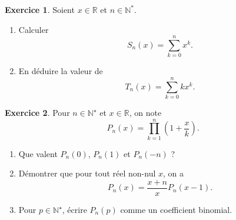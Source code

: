 \documentclass[a4paper, 11pt,openany]{article}%
\theoremstyle{plain}
\theoremstyle{definition}
\newtheorem{exo}{Exercice}
\newtheorem{sol}{Solution de l'exercice}
\theoremstyle{remark}
\newcommand{\R}{\mathbb{R}}
\newcommand{\N}{\mathbb{N}}
\begin{document}
\begin{exo}
	Soient $x\in \R$ et $n\in \N^*$.
	\begin{enumerate}
		\item Calculer \[ S_n(x) = \sum_{k=0}^n x^k.\]
		\item En déduire la valeur de $$T_n(x) = \sum_{k=0}^n kx^k.$$
	\end{enumerate}
\end{exo}
%

\begin{exo}
Pour $n \in \N^{\star}$ et $x \in \R$, on note $$P_n(x)= \prod_{k=1}^n \left(1+ \frac{x}{k} \right).$$
\begin{enumerate}
\item Que valent $P_n(0)$, $P_n(1)$ et $P_n(-n)$ ?
\item Démontrer que pour tout réel non-nul $x$, on a $$P_n(x)= \frac{x+n}{x} P_n(x-1).$$
\item Pour $p \in \N^{\star}$, écrire $P_n(p)$ comme un coefficient binomial.
\end{enumerate}
\end{exo}

\end{document}
